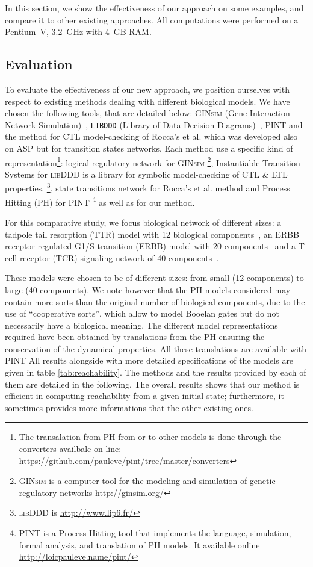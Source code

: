In this section, we show the effectiveness of our approach on some examples,
and compare it to other existing approaches.
All computations were performed on a Pentium~V, 3.2~GHz with 4~GB RAM.

\subsection{Evaluation}
To evaluate the effectiveness of our new approach,
we position ourselves with respect to existing methods dealing with different biological models.
We have chosen the following tools, that are detailed below: 
\textsc{GINsim} (Gene Interaction Network Simulation)~\cite{gonzalez2006ginsim,naldi2009logical,naldi2007decision},
\texttt{LIBDDD} (Library of Data Decision Diagrams)~\cite{thierry2009hierarchical,colange2013towards},  PINT \cite{PMR12-MSCS} and the method for CTL model-checking of Rocca's et al. \cite{roccaasp} which was developed also on ASP but for transition states networks.
Each method use a specific kind of representation\footnote{The transalation from PH from or to other models is done through the converters availbale on line: \url{https://github.com/pauleve/pint/tree/master/converters}}:
logical regulatory network for \textsc{GINsim} \footnote{\textsc{GINsim} is a computer tool for the modeling and simulation of genetic regulatory networks \url{http://ginsim.org/} },
Instantiable Transition Systems for \textsc{libDDD} is a library for symbolic model-checking of CTL \& LTL properties. \footnote{\textsc{libDDD} is \url{http://www.lip6.fr/} },
state transitions network for Rocca's et al. method
and Process Hitting (PH) for \textsc{PINT} \footnote{\textsc{PINT} is a Process Hitting tool that implements the language, simulation, formal analysis, and translation of PH models. It available online \url{http://loicpauleve.name/pint/} } as well as for our method.

For this comparative study, we focus biological network of different sizes:
a tadpole tail resorption (TTR) model with 12 biological components~\cite{khalis2009smbionet},
an ERBB receptor-regulated G1/S transition (ERBB) model with 20 components~\cite{Samaga2009}
and a T-cell receptor (TCR) signaling network of 40 components~\cite{Klamt06}.

These models were chosen to be of different sizes:
from small (12 components) to large (40 components).
We note however that the PH models considered may contain more sorts than
the original number of biological components, due to the use of
“cooperative sorts”, which allow to model Booelan gates but do not necessarily
have a biological meaning.
The different model representations required have been obtained by translations
from the PH
ensuring the conservation of the dynamical properties.
All these translations are available with \textsc{PINT} 
All results alongside with more detailed specifications of the models
are given in table \ref{tab:reachability}.
The methods and the results provided by each of them are detailed in the following.
The overall results shows that our method is efficient in computing reachability
from a given initial state;
furthermore, it sometimes provides more informations that the other existing ones.

